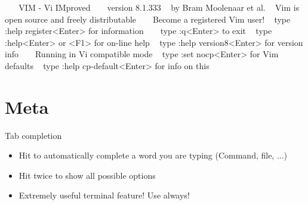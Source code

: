     \begin{frame}[t,fragile]{}
        \begin{bashenv}[\scriptsize]
~                                                                                       
~                                  VIM - Vi IMproved                                    
~                                                                                       
~                                   version 8.1.333                                     
~                               by Bram Moolenaar et al.                                
~                     Vim is open source and freely distributable                       
~                                                                                       
~                            Become a registered Vim user!                              
~                    type  :help register<Enter>   for information                      
~                                                                                       
~                    type  :q<Enter>               to exit                              
~                    type  :help<Enter>  or  <F1>  for on-line help                     
~                    type  :help version8<Enter>   for version info                     
~                                                                                       
~                            Running in Vi compatible mode                              
~                    type  :set nocp<Enter>        for Vim defaults                     
~                    type  :help cp-default<Enter> for info on this                     
~                                                                                       
~                                                                                       
        \end{bashenv}
    \end{frame}

    \section{Meta}

    \begin{frame}[t,fragile]{Tab completion}
        \begin{itemize}
            \item Hit \keys{\tab} to automatically complete a word you are typing
                (Command, file, ...)
            \item Hit \keys{\tab} twice to show all possible options
            \item Extremely useful terminal feature! Use always!
        \end{itemize}
    \end{frame}

